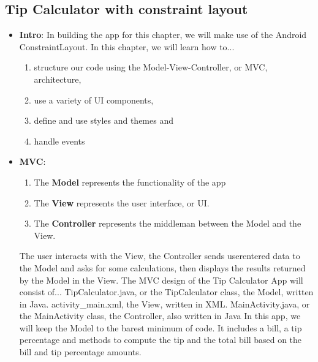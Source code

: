 \documentclass{report}
\begin{document}
    \subsection{Tip Calculator with constraint layout}
    \begin{itemize}
        \item \textbf{Intro}: In building the app for this chapter, we will make use of the Android ConstraintLayout.
            \bigbreak \noindent 
            In this chapter, we will learn how to...
            \begin{enumerate}
                \item structure our code using the Model-View-Controller, or MVC, architecture,
                \item use a variety of UI components,
                \item define and use styles and themes and
                \item handle events
            \end{enumerate}
        \item \textbf{MVC}:
            \begin{enumerate}
                \item The \textbf{Model} represents the functionality of the app
                \item The \textbf{View} represents the user interface, or UI.
                \item The \textbf{Controller} represents the middleman between the Model and the View.
            \end{enumerate}
            The user interacts with the View, the Controller sends userentered data to the Model and asks for some calculations, then displays the results returned by the Model in the View.
            \bigbreak \noindent 
            The MVC design of the Tip Calculator App will consist of...
            \bigbreak \noindent 
            TipCalculator.java, or the TipCalculator class, the Model, written in Java.
            \bigbreak \noindent 
            activity\_main.xml, the View, written in XML.
            \bigbreak \noindent 
            MainActivity.java, or the MainActivity class, the Controller, also written in Java
            \bigbreak \noindent 
            In this app, we will keep the Model to the barest minimum of code.
            \bigbreak \noindent 
            It includes a bill, a tip percentage and methods to compute the tip and the total bill based on the bill and tip percentage amounts.
            \bigbreak \noindent 

\end{itemize}
\end{document}
